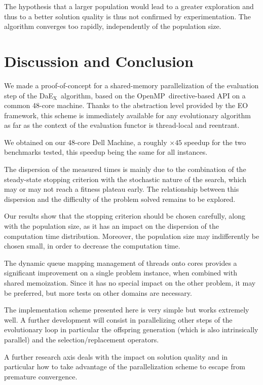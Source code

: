 \documentclass{sig-alternate}
\newcommand{\DAEX}{{\sc DaE$_{\text{X}}$}}
\newcommand{\OPENMP}{{\sc OpenMP}}
\begin{document}
The hypothesis that a larger population would lead to a greater exploration and
thus to a better solution quality is thus not confirmed by experimentation. The
algorithm converges too rapidly, independently of the population size.

\section{Discussion and Conclusion}
We made a proof-of-concept for a shared-memory parallelization of the evaluation
step of the \DAEX\ algorithm, based on the \OPENMP\ directive-based API on a
common 48-core machine. Thanks to the abstraction level provided by the EO
framework, this scheme is immediately available for any evolutionary algorithm
as far as the context of the evaluation functor is thread-local and reentrant.

We obtained on our 48-core Dell Machine, a roughly $\times45$ speedup for the two benchmarks tested, this speedup being the same for all instances.

The dispersion of the measured times is mainly due to the combination of the
steady-state stopping criterion with the stochastic nature of the search, which
may or may not reach a fitness plateau early. The relationship between this
dispersion and the difficulty of the problem solved remains to be explored.

Our results show that the stopping criterion should be chosen carefully, along
with the population size, as it has an impact on the dispersion of the
computation time distribution. Moreover, the population size may indifferently
be chosen small, in order to decrease the computation time.

The dynamic queue mapping management of threads onto cores provides a
significant improvement on a single problem instance, when combined with
shared memoization. Since it has no special impact on the other problem, it
may be preferred, but more tests on other domains are necessary.

The implementation scheme presented here is very simple but works extremely
well. A further development will consist in parallelizing other steps of the
evolutionary loop in particular the offspring generation (which is also
intrinsically parallel) and the selection/replacement operators.

A further research axis deals with the impact on solution quality and in
particular how to take advantage of the parallelization scheme to escape from
premature convergence.
\end{document}
